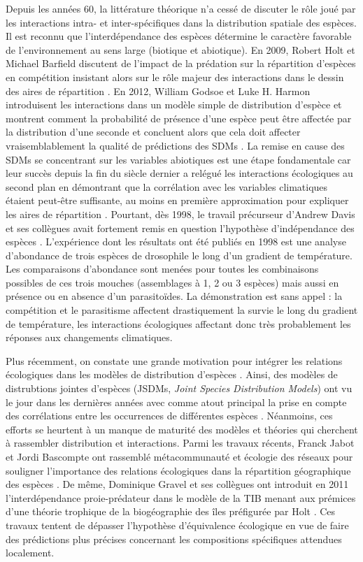 Depuis les années 60, la littérature théorique n'a cessé de discuter le
rôle joué par les interactions intra- et inter-spécifiques dans la
distribution spatiale des espèces. Il est reconnu que l'interdépendance
des espèces détermine le caractère favorable de l'environnement au sens
large (biotique et abiotique). En 2009, Robert Holt et Michael Barfield
discutent de l'impact de la prédation sur la répartition d'espèces en
compétition insistant alors sur le rôle majeur des interactions dans le
dessin des aires de répartition \citep{Holt2009}. En 2012, William
Godsoe et Luke H. Harmon introduisent les interactions dans un modèle
simple de distribution d'espèce et montrent comment la probabilité de
présence d'une espèce peut être affectée par la distribution d'une
seconde et concluent alors que cela doit affecter vraisemblablement la
qualité de prédictions des SDMs \citep{Godsoe2012}. La remise en cause
des SDMs se concentrant sur les variables abiotiques est une étape
fondamentale car leur succès depuis la fin du siècle dernier a relégué
les interactions écologiques au second plan en démontrant que la
corrélation avec les variables climatiques étaient peut-être suffisante,
au moins en première approximation pour expliquer les aires de
répartition \citep{Pearson2003}. Pourtant, dès 1998, le travail
précurseur d'Andrew Davis et ses collègues \citep{Davis1998} avait
fortement remis en question l'hypothèse d'indépendance des espèces
\citep{Jeschke2008}. L'expérience dont les résultats ont été publiés en
1998 est une analyse d'abondance de trois espèces de drosophile le long
d'un gradient de température. Les comparaisons d'abondance sont menées
pour toutes les combinaisons possibles de ces trois mouches (assemblages
à 1, 2 ou 3 espèces) mais aussi en présence ou en absence d'un
parasitoïdes. La démonstration est sans appel : la compétition et le
parasitisme affectent drastiquement la survie le long du gradient de
température, les interactions écologiques affectant donc très
probablement les réponses aux changements climatiques.

Plus récemment, on constate une grande motivation pour intégrer les
relations écologiques dans les modèles de distribution d'espèces
\citep{Kissling2012, Guisan2011}. Ainsi, des modèles de distrubtions
jointes d'espèces (JSDMs, \emph{Joint Species Distribution Models}) ont
vu le jour dans les dernières années avec comme atout principal la prise
en compte des corrélations entre les occurrences de différentes espèces
\citep{Pollock2014, Ovaskainen2010}. Néanmoins, ces efforts se heurtent
à un manque de maturité des modèles et théories qui cherchent à
rassembler distribution et interactions. Parmi les travaux récents,
Franck Jabot et Jordi Bascompte ont rassemblé métacommunauté et écologie
des réseaux pour souligner l'importance des relations écologiques dans
la répartition géographique des espèces \citep{Jabot2012}. De même,
Dominique Gravel et ses collègues ont introduit en 2011
l'interdépendance proie-prédateur dans le modèle de la TIB menant aux
prémices d'une théorie trophique de la biogéographie des îles
\citep{Gravel2011} préfigurée par Holt \citep{Holt2009a}. Ces travaux
tentent de dépasser l'hypothèse d'équivalence écologique en vue de faire
des prédictions plus précises concernant les compositions spécifiques
attendues localement.

